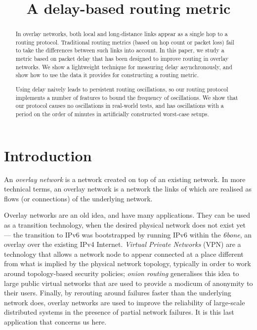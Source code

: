 \documentclass[conference,letterpaper]{IEEEtran}
\title{A delay-based routing metric}
\author{
  \IEEEauthorblockN{Baptiste Jonglez}\IEEEauthorblockA{École Normale Supérieure de Lyon}
  \and
  \IEEEauthorblockN{Matthieu Boutier}
  \IEEEauthorblockA{Université Paris-Diderot}
  \and
  \IEEEauthorblockN{Juliusz Chroboczek}
  \IEEEauthorblockA{Université Paris-Diderot}
}
\begin{document}
\maketitle

\begin{abstract}
  In overlay networks, both local and long-distance links appear as
  a single hop to a routing protocol.  Traditional routing metrics
  (based on hop count or packet loss) fail to take the differences
  between such links into account.  In this paper, we study a metric
  based on packet delay that has been designed to improve routing in
  overlay networks.  We show a lightweight technique for measuring
  delay asynchronously, and show how to use the data it provides for
  constructing a routing metric.

  Using delay naively leads to persistent routing oscillations, so our
  routing protocol implements a number of features to bound the
  frequency of oscillations.  We show that our protocol causes no
  oscillations in real-world tests, and has oscillations with a period
  on the order of minutes in artificially constructed worst-case setups.
\end{abstract}

\section{Introduction}

An \emph{overlay network} is a network created on top of an existing
network.  In more technical terms, an overlay network is a network the
links of which are realised as flows (or connections) of the
underlying network.

Overlay networks are an old idea, and have many applications.  They
can be used as a transition technology, when the desired physical
network does not exist yet --- the transition to IPv6 was bootstrapped
by running IPv6 within the \emph{6bone}, an overlay over the existing
IPv4 Internet.  \emph{Virtual Private Networks} (VPN) are a technology
that allows a network node to appear connected at a place different
from what is implied by the physical network topology, typically in
order to work around topology-based security policies; \emph{onion
  routing} \cite{tor} generalises this idea to large public virtual
networks that are used to provide a modicum of anonymity to their
users.  Finally, by rerouting around failures faster than the
underlying network does, overlay networks are used to improve the
reliability of large-scale distributed systems in the presence of
partial network failures.  It is this last application that concerns
us here.
\end{document}
